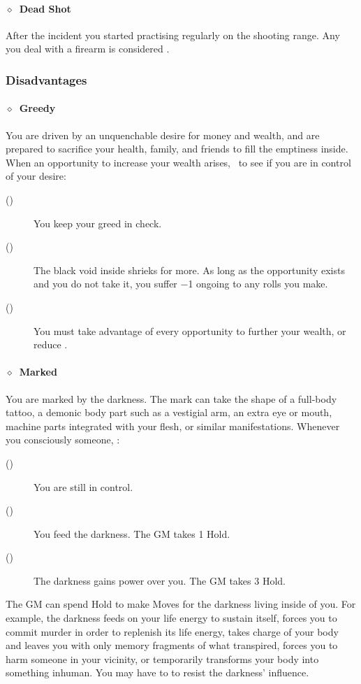 \paragraph{\(\diamond\)~Dead Shot}%
After the incident you started practising regularly on the shooting range.
Any  you deal with a firearm is considered .
\KULTrule%

\subsubsection{Disadvantages}%
\label{ssub:careerist_disadvantages}

\paragraph{\(\diamond\)~Greedy}%
You are driven by an unquenchable desire for money and wealth, and are prepared to sacrifice your
health, family, and friends to fill the emptiness inside. When an opportunity to increase your
wealth arises, ~to see if you are in control of your desire:
\begin{description}
 \item[()] You keep your greed in check.
 \item[()] The black void inside shrieks for more. As long as the opportunity exists and you do not take it, you suffer −1 ongoing to any rolls you make.
 \item[()] You must take advantage of every opportunity to further your wealth, or reduce .
\end{description}
\KULTrule%

\paragraph{\(\diamond\)~Marked}%
You are marked by the darkness. The mark can take the shape of a full-body tattoo, a demonic body part such as a vestigial arm,
an extra eye or mouth, machine parts integrated with your flesh, or similar manifestations.
Whenever you consciously  someone, :
\begin{description}
 \item[()] You are still in control.
 \item[()] You feed the darkness. The GM takes 1 Hold.
 \item[()] The darkness gains power over you. The GM takes 3 Hold.
\end{description}
The GM can spend Hold to make Moves for the darkness living inside of you. For example, the darkness feeds on your life energy
to sustain itself, forces you to commit murder in order to replenish its life energy, takes charge of your body and leaves you
with only memory fragments of what transpired, forces you to harm someone in your vicinity, or temporarily transforms your body
into something inhuman. You may have to  to resist the darkness’ influence.
\KULTrule%

